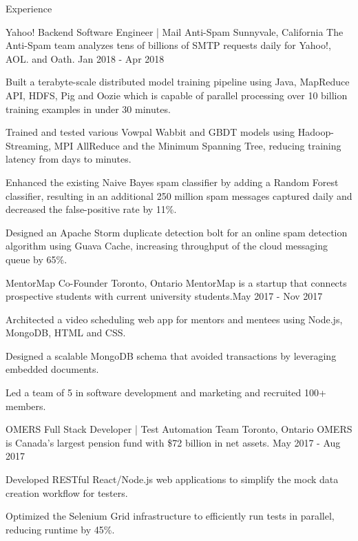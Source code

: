 \documentclass{resume} %
\begin{document}
\begin{rSection}{Experience}

\begin{expSec}
{Yahoo!}
{Backend Software Engineer | Mail Anti-Spam}
{Sunnyvale, California}
{The Anti-Spam team analyzes tens of billions of SMTP requests daily for Yahoo!, AOL. and Oath.}
{Jan 2018 - Apr 2018}
\item Built a terabyte-scale distributed model training pipeline using Java, MapReduce API, HDFS, Pig and Oozie which is capable of parallel processing over 10 billion training examples in under 30 minutes.
\item Trained and tested various Vowpal Wabbit and GBDT models using Hadoop-Streaming, MPI AllReduce and the Minimum Spanning Tree, reducing training latency from days to minutes.
\item Enhanced the existing Naive Bayes spam classifier by adding a Random Forest classifier, resulting in an additional 250 million spam messages captured daily and decreased the false-positive rate by 11\%.
\item Designed an Apache Storm duplicate detection bolt for an online spam detection algorithm using Guava Cache, increasing throughput of the cloud messaging queue by 65\%.

\end{expSec}

\begin{expSec}
{MentorMap}
{Co-Founder \href{https://www.mentormap.ca/}{\space\small\faExternalLink}}
{Toronto, Ontario}
{MentorMap is a startup that connects prospective students with current university students.}{May 2017 - Nov 2017}
\item Architected a video scheduling web app for mentors and mentees using Node.js, MongoDB, HTML and CSS.
\item Designed a scalable MongoDB schema that avoided transactions by leveraging embedded documents.
\item Led a team of 5 in software development and marketing and recruited 100+ members.
\end{expSec}

\begin{expSec}
{OMERS}
{Full Stack Developer | Test Automation Team}
{Toronto, Ontario}
{OMERS is Canada's largest pension fund with \$72 billion in net assets.}
{May 2017 - Aug 2017}
\item Developed RESTful React/Node.js web applications to simplify the mock data creation workflow for testers.
\item Optimized the Selenium Grid infrastructure to efficiently run tests in parallel, reducing runtime by 45\%. \end{expSec}

\end{rSection}
\end{document}
